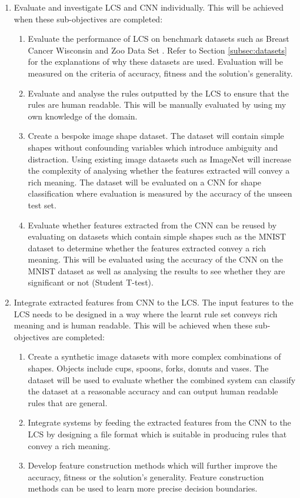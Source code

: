\begin{enumerate}
	\item  Evaluate and investigate LCS and CNN individually. This will be achieved when these sub-objectives are completed:
	
	\begin{enumerate}
		\item Evaluate the performance of LCS on benchmark datasets such as Breast Cancer Wisconsin \cite{wisconsinbreast} and Zoo Data Set \cite{zoodata}. Refer to Section \ref{subsec:datasets} for the explanations of why these datasets are used. Evaluation will be measured on the criteria of accuracy, fitness and the solution's generality.
		\item Evaluate and analyse the rules outputted by the LCS to ensure that the rules are human readable. This will be manually evaluated by using my own knowledge of the domain. 
		
		\item Create a bespoke image shape dataset. The dataset will contain simple shapes without confounding variables which introduce ambiguity and distraction. Using existing image datasets such as ImageNet \cite{imagenet} will increase the complexity of analysing whether the features extracted will convey a rich meaning. The dataset will be evaluated on a CNN for shape classification where evaluation is measured by the accuracy of the unseen test set.
		
		\item Evaluate whether features extracted from the CNN can be reused by evaluating on datasets which contain simple shapes such as the MNIST dataset to determine whether the features extracted convey a rich meaning. This will be evaluated using the accuracy of the CNN on the MNIST dataset as well as analysing the results to see whether they are significant or not (Student T-test). 
		
	\end{enumerate}
	
	\item  Integrate extracted features from CNN to the LCS. The input features to the LCS needs to be designed in a way where the learnt rule set conveys rich meaning and is human readable. This will be achieved when these sub-objectives are completed:
	
	\begin{enumerate}
		\item Create a synthetic image datasets with more complex combinations of shapes. Objects include cups, spoons, forks, donuts and vases. The dataset will be used to evaluate whether the combined system can classify the dataset at a reasonable accuracy and can output human readable rules that are general. 
		\item Integrate systems by feeding the extracted features from the CNN to the LCS by designing a file format which is suitable in producing rules that convey a rich meaning.
		\item Develop feature construction methods which will further improve the accuracy, fitness or the solution's generality. Feature construction methods can be used to learn more precise decision boundaries.
		

\end{enumerate}
\end{enumerate}
